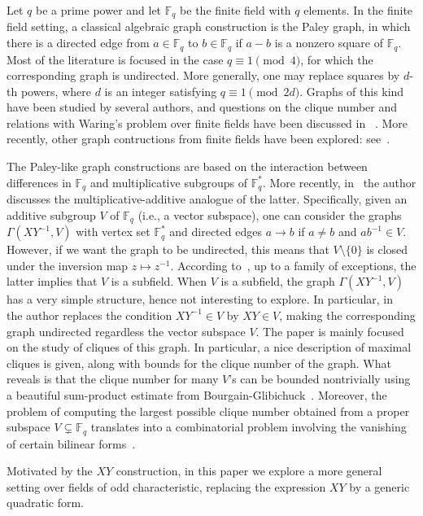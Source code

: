 \documentclass[11pt]{amsart}
\newcommand{\F}{\mathbb F}
\theoremstyle{definition}
\theoremstyle{remark}
\begin{document}
Let $q$ be a prime power and let $\F_q$ be the finite field with $q$ elements. In the finite field setting, a classical algebraic graph construction is the Paley graph, in which there is a directed edge from $a\in \F_q$ to $b\in \F_q$ if $a-b$ is a nonzero square of $\F_q$. Most of the literature is focused in the case $q\equiv 1\pmod 4$, for which the corresponding graph is undirected. More generally, one may replace squares by $d$-th powers, where $d$ is an integer satisfying $q\equiv 1\pmod {2d}$. Graphs of this kind have been studied by several authors, and questions on the clique number and relations with Waring's problem over finite fields have been discussed in ~\cite{cohen,paley, pod, csaba,yip2}. More recently, other graph contructions from finite fields have been explored: see~\cite{kim2026,mans2020, yip2025}.

The Paley-like graph constructions are based on the interaction between differences in $\F_q$ and multiplicative subgroups of $\F_q^*$. More recently, in~\cite{reis2} the author discusses the multiplicative-additive analogue of the latter. Specifically, given an additive subgroup $V$ of $\F_q$ (i.e., a vector subspace), one can consider the graphs $\Gamma(XY^{-1}, V)$ with vertex set $\F_q^*$ and directed edges $a\to b$ if $a\ne b$ and $ab^{-1}\in V$. However, if we want the graph to be undirected, this means that $V\setminus \{0\}$ is closed under the inversion map $z\mapsto z^{-1}$. According to~\cite{bence}, up to a family of exceptions, the latter implies that $V$ is a subfield. When $V$ is a subfield, the graph $\Gamma(XY^{-1}, V)$ has a very simple structure, hence not interesting to explore. In particular, in~\cite{reis2} the author replaces the condition $XY^{-1}\in V$ by $XY\in V$, making the corresponding graph undirected regardless the vector subspace $V$. The paper is mainly focused on the study of cliques of this graph. In particular, a nice description of maximal cliques is given, along with bounds for the clique number of the graph. What reveals is that the clique number for many $V$'s can be bounded nontrivially using a beautiful sum-product estimate from Bourgain-Glibichuck~\cite{bourgain}. Moreover, the problem of computing the largest possible clique number obtained from a proper subspace $V\subsetneq \F_q$ translates into a combinatorial problem involving the vanishing of certain bilinear forms~\cite{ah}. 

Motivated by the $XY$ construction, in this paper we explore a more general setting over fields of odd characteristic, replacing the expression $XY$ by a generic quadratic form. 
\end{document}
